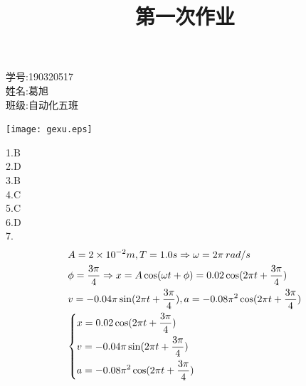 \documentclass{article}
\begin{document}
\title{第一次作业}
\maketitle
\begin{minipage}[b]{0.5\linewidth}
学号:190320517\\
姓名:葛旭\\
班级:自动化五班\\
\end{minipage}
\hfill
\begin{minipage}[b]{0.5\linewidth}
\texttt{[image: gexu.eps]}\\
\end{minipage}
1.B\\
2.D\\
3.B\\
4.C\\
5.C\\
6.D\\
7.\[\begin{gathered}
  A = 2 \times {10^{ - 2}}m,T = 1.0s \Rightarrow \omega  = 2\pi {\kern 1pt} {\kern 1pt} rad/s \hfill \\
  \phi  = \frac{{3\pi }}{4} \Rightarrow x = A\cos (\omega t + \phi ) = 0.02\cos (2\pi t + \frac{{3\pi }}{4}) \hfill \\
  v =  - 0.04\pi \sin (2\pi t + \frac{{3\pi }}{4}),a =  - 0.08{\pi ^2}\cos (2\pi t + \frac{{3\pi }}{4}) \hfill \\
  \left\{ \begin{gathered}
  x = 0.02\cos (2\pi t + \frac{{3\pi }}{4}) \hfill \\
  v =  - 0.04\pi \sin (2\pi t + \frac{{3\pi }}{4}) \hfill \\
  a =  - 0.08{\pi ^2}\cos (2\pi t + \frac{{3\pi }}{4}) \hfill \\
\end{gathered}  \right. \hfill \\
\end{gathered} \]
\end{document}
